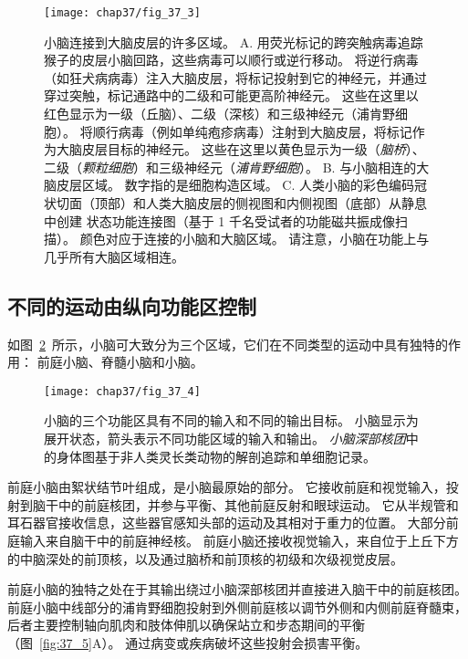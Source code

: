 \begin{figure}[htbp]
	\centering
	\texttt{[image: chap37/fig\_37\_3]}
	\caption{小脑连接到大脑皮层的许多区域\cite{bostan2013cerebellar}。
		A. 用荧光标记的跨突触病毒追踪猴子的皮层小脑回路，这些病毒可以顺行或逆行移动。
		将逆行病毒（如狂犬病病毒）注入大脑皮层，将标记投射到它的神经元，并通过穿过突触，标记通路中的二级和可能更高阶神经元。
		这些在这里以红色显示为一级（丘脑）、二级（深核）和三级神经元（浦肯野细胞）。
		将顺行病毒（例如单纯疱疹病毒）注射到大脑皮层，将标记作为大脑皮层目标的神经元。
		这些在这里以黄色显示为一级（\textit{脑桥}）、二级（\textit{颗粒细胞}）和三级神经元（\textit{浦肯野细胞}）。
		B. 与小脑相连的大脑皮层区域。 数字指的是细胞构造区域。
		C. 人类小脑的彩色编码冠状切面（顶部）和人类大脑皮层的侧视图和内侧视图（底部）从静息中创建 状态功能连接图（基于 1 千名受试者的功能磁共振成像扫描）。
		颜色对应于连接的小脑和大脑区域。
		请注意，小脑在功能上与几乎所有大脑区域相连。}
	\label{fig:37_3}
\end{figure}



\subsection{不同的运动由纵向功能区控制}

如图~\ref{fig:37_4}~所示，小脑可大致分为三个区域，它们在不同类型的运动中具有独特的作用：
前庭小脑、脊髓小脑和小脑。


\begin{figure}[htbp]
	\centering
	\texttt{[image: chap37/fig\_37\_4]}
	\caption{小脑的三个功能区具有不同的输入和不同的输出目标。
		小脑显示为展开状态，箭头表示不同功能区域的输入和输出。
		\textit{小脑深部核团}中的身体图基于非人类灵长类动物的解剖追踪和单细胞记录\cite{brooks1981handbook}。}
	\label{fig:37_4}
\end{figure}


前庭小脑由絮状结节叶组成，是小脑最原始的部分。
它接收前庭和视觉输入，投射到脑干中的前庭核团，并参与平衡、其他前庭反射和眼球运动。
它从半规管和耳石器官接收信息，这些器官感知头部的运动及其相对于重力的位置。
大部分前庭输入来自脑干中的前庭神经核。
前庭小脑还接收视觉输入，来自位于上丘下方的中脑深处的前顶核，以及通过脑桥和前顶核的初级和次级视觉皮层。


前庭小脑的独特之处在于其输出绕过小脑深部核团并直接进入脑干中的前庭核团。
前庭小脑中线部分的浦肯野细胞投射到外侧前庭核以调节外侧和内侧前庭脊髓束，后者主要控制轴向肌肉和肢体伸肌以确保站立和步态期间的平衡（图~\ref{fig:37_5}A）。
通过病变或疾病破坏这些投射会损害平衡。


